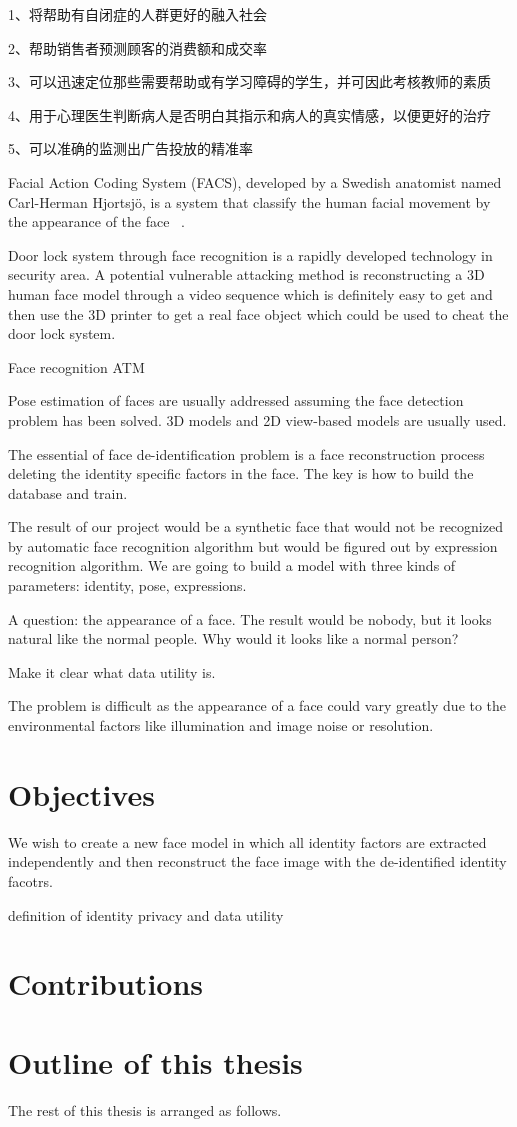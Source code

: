 1、将帮助有自闭症的人群更好的融入社会

       2、帮助销售者预测顾客的消费额和成交率

       3、可以迅速定位那些需要帮助或有学习障碍的学生，并可因此考核教师的素质

       4、用于心理医生判断病人是否明白其指示和病人的真实情感，以便更好的治疗

       5、可以准确的监测出广告投放的精准率

Facial Action Coding System (FACS), developed by a Swedish anatomist named Carl-Herman Hjortsjö, is a system that classify the human facial movement by the appearance of the face ~\cite{facs70}. 


\par
Door lock system through face recognition is a rapidly developed technology in security area. A potential vulnerable attacking method is reconstructing a 3D human face model through a video sequence which is definitely easy to get and then use the 3D printer to get a real face object which could be used to cheat the door lock system. 

Face recognition ATM



Pose estimation of faces are usually addressed assuming the face detection problem has been solved. 3D models and 2D view-based models are usually used. 


The essential of face de-identification problem is a face reconstruction process deleting the identity specific factors in the face.  
The key is how to build the database and train. 

The result of our project would be a synthetic face that would not be recognized by automatic face recognition algorithm but would be figured out by expression recognition algorithm. We are going to build a model with three kinds of parameters: identity, pose, expressions. 

A question: the appearance of a face. The result would be nobody, but it looks natural like the normal people. Why would it looks like a normal person?

Make it clear what data utility is. 

The problem is difficult as the appearance of a face could vary greatly due to the environmental factors like illumination and image noise or resolution. 

\section{Objectives}
We wish to create a new face model in which all identity factors are extracted independently and then reconstruct the face image with the de-identified identity facotrs. 

definition of identity privacy and data utility

\section{Contributions}
\par


\section{Outline of this thesis}
\par 
The rest of this thesis is arranged as follows. 